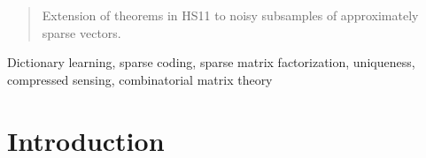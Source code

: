 \documentclass[journal,onecolumn]{IEEEtran}
\begin{document}







\maketitle


\begin{abstract}
Extension of theorems in HS11 to noisy subsamples of approximately sparse vectors.
\end{abstract}


\begin{IEEEkeywords}
Dictionary learning, sparse coding, sparse matrix factorization, uniqueness, compressed sensing, combinatorial matrix theory
\end{IEEEkeywords}

%

\section{Introduction}
% 
% 
% 
% 
\end{document}
